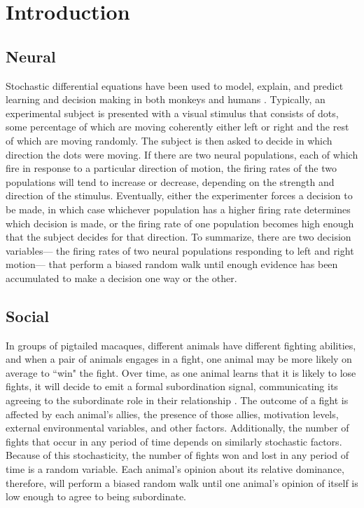 \documentclass{article}
\begin{document}
\section{Introduction}

\subsection{Neural }
Stochastic differential equations have been used to model, explain, and predict learning and decision making in both monkeys and humans \citep{Eckhoff:2008uq, Brown:2005fk,Feng:2009kl,Bogacz:2006uq}.  Typically, an experimental subject is presented with a visual stimulus that consists of dots, some percentage of which are moving coherently either left or right and the rest of which are moving randomly.  The subject is then asked to decide in which direction the dots were moving.  If there are two neural populations, each of which fire in response to a particular direction of motion, the firing rates of the two populations will tend to increase or decrease, depending on the strength and direction of the stimulus.  Eventually, either the experimenter forces a decision to be made, in which case whichever population has a higher firing rate determines which decision is made, or the firing rate of one population becomes high enough that the subject decides for that direction.  To summarize, there are two decision variables--- the firing rates of two neural populations responding to left and right motion--- that perform a biased random walk until enough evidence has been accumulated to make a decision one way or the other.


\subsection{Social }
In groups of pigtailed macaques, different animals have different fighting abilities, and when a pair of animals engages in a fight, one animal may be more likely on average to ``win" the fight.  Over time, as one animal learns that it is likely to lose fights, it will decide to emit a formal subordination signal, communicating its agreeing to the subordinate role in their relationship \citep{Flack:2007kx, Flack:2006fk,Flack:2004oq, Waal:1985fk,Caldecott:1986uk}.  The outcome of a fight is affected by each animal's allies, the presence of those allies, motivation levels,  external environmental variables, and other factors.  Additionally, the number of fights that occur in any period of time depends on similarly stochastic factors.  Because of this stochasticity, the number of fights won and lost in any period of time is a random variable.  Each animal's opinion about its relative dominance, therefore, will perform a biased random walk until one animal's opinion of itself is low enough to agree to being subordinate.
\end{document}
